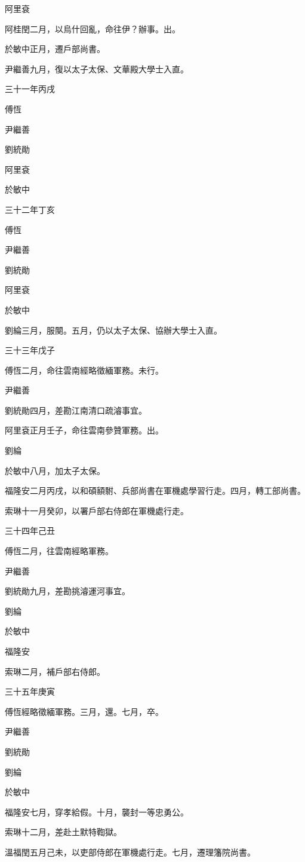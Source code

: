 \begin{pinyinscope}
阿里袞

阿桂閏二月，以烏什回亂，命往伊？辦事。出。

於敏中正月，遷戶部尚書。

尹繼善九月，復以太子太保、文華殿大學士入直。

三十一年丙戌

傅恆

尹繼善

劉統勛

阿里袞

於敏中

三十二年丁亥

傅恆

尹繼善

劉統勛

阿里袞

於敏中

劉綸三月，服闋。五月，仍以太子太保、協辦大學士入直。

三十三年戊子

傅恆二月，命往雲南經略徵緬軍務。未行。

尹繼善

劉統勛四月，差勘江南清口疏濬事宜。

阿里袞正月壬子，命往雲南參贊軍務。出。

劉綸

於敏中八月，加太子太保。

福隆安二月丙戌，以和碩額駙、兵部尚書在軍機處學習行走。四月，轉工部尚書。

索琳十一月癸卯，以署戶部右侍郎在軍機處行走。

三十四年己丑

傅恆二月，往雲南經略軍務。

尹繼善

劉統勛九月，差勘挑濬運河事宜。

劉綸

於敏中

福隆安

索琳二月，補戶部右侍郎。

三十五年庚寅

傅恆經略徵緬軍務。三月，還。七月，卒。

尹繼善

劉統勛

劉綸

於敏中

福隆安七月，穿孝給假。十月，襲封一等忠勇公。

索琳十二月，差赴土默特鞫獄。

溫福閏五月己未，以吏部侍郎在軍機處行走。七月，遷理籓院尚書。


\end{pinyinscope}
